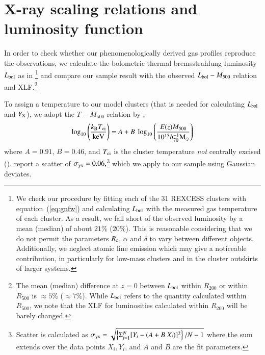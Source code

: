 \documentclass[useAMS,usenatbib]{mn2e}
\begin{document}
\section{X-ray scaling relations and luminosity function}
\label{sec:4}

In order to check whether our phenomenologically derived gas profiles reproduce
the observations, we calculate the bolometric thermal bremsstrahlung
luminosity $L_{{\mathrm{bol}}}$ as in \cite{1988xrec.book.....S}\footnote{We check
  our procedure by fitting each of the 31 REXCESS clusters with
  equation~(\ref{eq:gnfw}) and calculating $L_{{\mathrm{bol}}}$ with the measured gas
  temperature of each cluster. As a result, we fall short of the observed
  luminosity by a mean (median) of about $21\%$ ($20\%$). This is reasonable
  considering that we do not permit the parameters $R_{{\mathrm{c}}}$, $\alpha$ and
  $\delta$ to vary between different objects. Additionally, we neglect atomic
  line emission which may give a noticeable contribution, in particularly for
  low-mass clusters and in the cluster outskirts of larger systems.}  and
compare our sample result with the observed $L_{{\mathrm{bol}}} - M_{500}$ relation
and XLF.\footnote{The mean (median) difference at $z=0$ between
  $L_{{\mathrm{bol}}}$ within $R_{200}$ or within $R_{500}$ is $\approx 5\%$ ($\approx
  7\%$). While $L_{{\mathrm{bol}}}$ refers to the quantity calculated within
  $R_{500}$, we note that the XLF for luminosities calculated within $R_{200}$
  will be barely changed.}

To assign a temperature to our model clusters (that is needed for calculating
$L_{{\mathrm{bol}}}$ and $Y_{{\mathrm{X}}}$), we adopt the $T-M_{500}$ relation by
\cite{2010MNRAS.406.1773M},
\begin{equation}
\log_{10} \left( \frac{k_{{\mathrm{B}}}T_{{\mathrm{ci}}}}{{\mathrm{keV}}} \right) = 
A + B~\log_{10} \left( \frac{E(z) M_{500}}{10^{15} h_{70}^{-1} {\mathrm{M_{\odot}}}} \right)
\label{eq:temp}
\end{equation}
where $A=0.91$, $B=0.46$, and $T_{{\mathrm{ci}}}$ is the cluster temperature
\emph{not} centrally excised
(\citealp{2010MNRAS.406.1773M}). \cite{2010MNRAS.406.1773M} report a scatter of
$\sigma_{{\mathrm{yx}}} = 0.06,$\footnote{Scatter is calculated as $\sigma_{{\mathrm{yx}}}
  = \sqrt{ \left\{ \Sigma_{i=1}^{N} [Y_{i}-(A+B~X_{i})]^{2}\right\} / N-1}$
  where the sum extends over the data points $X_{i}, Y_{i}$, and $A$ and $B$ are
  the fit parameters.} which we apply to our sample using Gaussian deviates.
\end{document}
